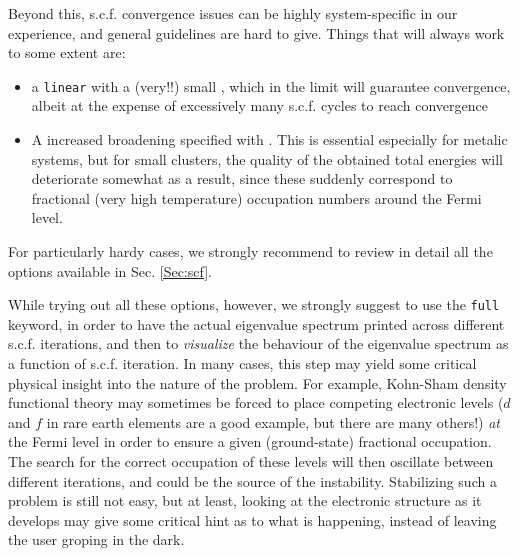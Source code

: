Beyond this, s.c.f. convergence issues can be highly system-specific
in our experience, and general guidelines are hard to give. Things
that will always work to some extent are:
\begin{itemize}
  \item a \texttt{linear}  with a (very!!) small
    , which in the limit will guarantee
    convergence, albeit at the expense of excessively many
    s.c.f. cycles to reach convergence
  \item A increased broadening specified with
    . This is essential especially for
    metalic systems, but for small clusters, the quality of the
    obtained total energies will deteriorate somewhat as a result,
    since these suddenly correspond to fractional (very high
    temperature) occupation numbers around the Fermi level. 
\end{itemize}
For particularly hardy cases, we strongly recommend to review in detail
all the options available in Sec. \ref{Sec:scf}.

While trying out all these options, however, we strongly
suggest to use the  \texttt{full} keyword, in
order to have the actual eigenvalue spectrum printed across different
s.c.f. iterations, and then to \emph{visualize} the behaviour of the
eigenvalue spectrum as a function of s.c.f. iteration. In many cases,
this step may yield some critical physical insight into the nature of
the problem. For example, Kohn-Sham density functional theory may
sometimes be forced to place competing electronic levels ($d$ and $f$
in rare earth elements are a good example, but there are many others!)
\emph{at} the Fermi level in order to ensure a given (ground-state)
fractional occupation. The search for the correct occupation of these
levels will then oscillate between different iterations, and could be
the source of the instability. Stabilizing such a problem is still
not easy, but at least, looking at the electronic structure as it
develops may give some critical hint as to what is happening,
instead of leaving the user groping in the dark. 
